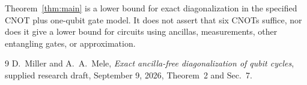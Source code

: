 \documentclass[11pt]{article}
\begin{document}
Theorem~\ref{thm:main} is a lower bound for exact diagonalization in
the specified CNOT plus one-qubit gate model.  It does not assert that
six CNOTs suffice, nor does it give a lower bound for circuits using
ancillas, measurements, other entangling gates, or approximation.

\begin{thebibliography}{9}
D.~Miller and A.~A.~Mele, \emph{Exact ancilla-free diagonalization of
qubit cycles}, supplied research draft, September 9, 2026,
Theorem~2 and Sec.~7.
\end{thebibliography}
\end{document}
